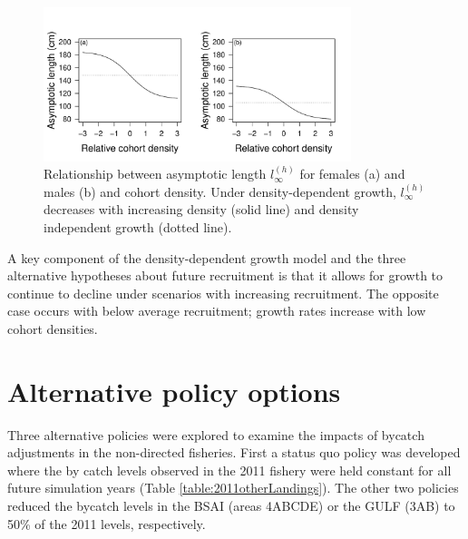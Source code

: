 \begin{figure}[htbp]
	\centering
		\includegraphics[width=0.8\textwidth]{../FIGURES/fig:pres:Linf.pdf}
	\caption{Relationship between asymptotic length $l_\infty^{(h)}$ for females (a) and males (b) and cohort density. Under density-dependent growth, $l_\infty^{(h)}$ decreases with increasing density (solid line) and density independent growth (dotted line).  }
	\label{fig:FIGURES_figLinf}
\end{figure}

A key component of the density-dependent growth model and the three alternative hypotheses about future recruitment is that it allows for growth to continue to decline under scenarios with increasing recruitment.  The opposite case occurs with below average recruitment; growth rates increase with low cohort densities.  





\section{Alternative policy options} %
\label{sec:alternative_policy_options}

Three alternative policies were explored to examine the impacts of bycatch adjustments in the non-directed fisheries.  First a status quo policy was developed where the by catch levels observed in the 2011 fishery were held constant for all future simulation years (Table \ref{table:2011otherLandings}).  The other two policies reduced the bycatch levels in the BSAI (areas 4ABCDE) or the GULF (3AB) to 50\% of the 2011 levels, respectively.  

